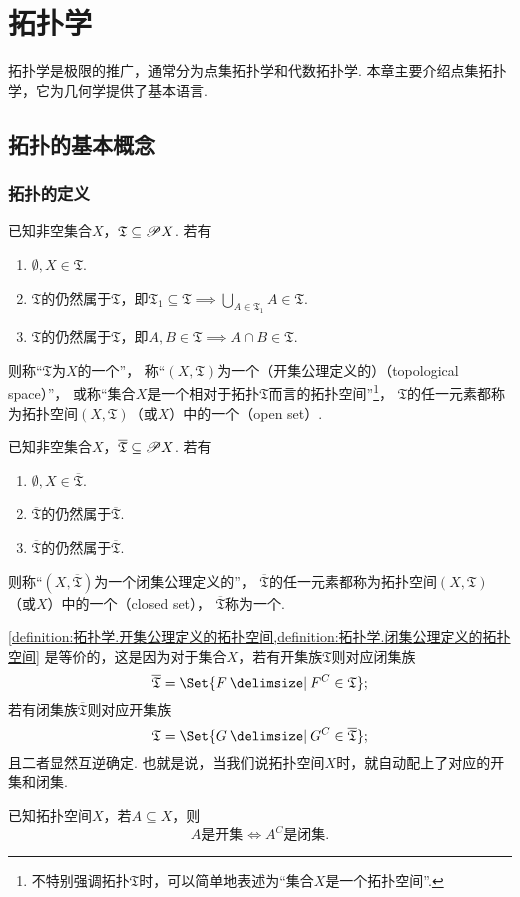 \chapter{拓扑学}
拓扑学是极限的推广，通常分为点集拓扑学和代数拓扑学.
本章主要介绍点集拓扑学，它为几何学提供了基本语言.

\begingroup
\def\T{\mathfrak T}%
\def\oT{\overline{\mathfrak T}}%

\section{拓扑的基本概念}
\subsection{拓扑的定义}
\begin{definition}\label{definition:拓扑学.开集公理定义的拓扑空间}
已知非空集合\(X\)，\(\T \subseteq \Powerset X\).
若有\begin{enumerate}
\item \(\emptyset,X \in \T\).
\item \(\T\)的仍然属于\(\T\)，即\(\T_1 \subseteq \T \implies \bigcup_{A \in \T_1} A \in \T\). 
\item \(\T\)的仍然属于\(\T\)，即\(A,B \in \T \implies A \cap B \in \T\).
\end{enumerate}
则称“\(\T\)为\(X\)的一个”，%
称“\((X,\T)\)为一个（开集公理定义的）（topological space）”，%
或称“集合\(X\)是一个相对于拓扑\(\T\)而言的拓扑空间”\footnote{%
不特别强调拓扑\(\T\)时，可以简单地表述为“集合\(X\)是一个拓扑空间”.%
}，%
\(\T\)的任一元素都称为拓扑空间\((X,\T)\)（或\(X\)）中的一个（open set）.
\end{definition}

\begin{definition}\label{definition:拓扑学.闭集公理定义的拓扑空间}
已知非空集合\(X\)，\(\oT \subseteq \Powerset X\).
若有\begin{enumerate}
\item \(\emptyset,X \in \oT\).
\item \(\oT\)的仍然属于\(\oT\).
\item \(\oT\)的仍然属于\(\oT\).
\end{enumerate}
则称“\((X,\oT)\)为一个闭集公理定义的”，%
\(\oT\)的任一元素都称为拓扑空间\((X,\T)\)（或\(X\)）中的一个（closed set），%
\(\oT\)称为一个.
\end{definition}

\cref{definition:拓扑学.开集公理定义的拓扑空间,definition:拓扑学.闭集公理定义的拓扑空间} 是等价的，这是因为对于集合\(X\)，若有开集族\(\T\)则对应闭集族\[
\oT = \Set{ F \given F^C \in \T };
\]若有闭集族\(\oT\)则对应开集族\[
\T = \Set{ G \given G^C \in \oT };
\]且二者显然互逆确定.
也就是说，当我们说拓扑空间\(X\)时，就自动配上了对应的开集和闭集.

\begin{theorem}
已知拓扑空间\(X\)，若\(A \subseteq X\)，则\[
A\text{是开集} \iff A^C\text{是闭集}.
\]
\end{theorem}

\endgroup
